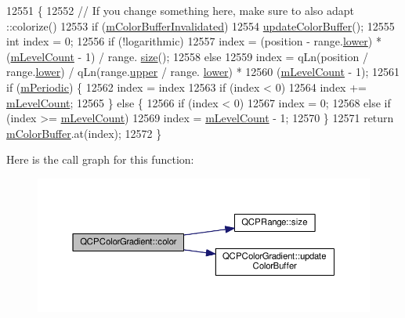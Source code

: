 \begin{DoxyCode}
12551                                                \{
12552   \textcolor{comment}{// If you change something here, make sure to also adapt ::colorize()}
12553   \textcolor{keywordflow}{if} (\hyperlink{class_q_c_p_color_gradient_abacf55e11f67d6722a687af1bb2687bd}{mColorBufferInvalidated})
12554     \hyperlink{class_q_c_p_color_gradient_a353f15ab3ab586eebf1f6b58c3e2707b}{updateColorBuffer}();
12555   \textcolor{keywordtype}{int} index = 0;
12556   \textcolor{keywordflow}{if} (!logarithmic)
12557     index = (position - range.\hyperlink{class_q_c_p_range_aa3aca3edb14f7ca0c85d912647b91745}{lower}) * (\hyperlink{class_q_c_p_color_gradient_a98fb68e359904b2c991fcae3e38a211a}{mLevelCount} - 1) / range.
      \hyperlink{class_q_c_p_range_afa57c13049b965edb6fd1c00ac56338a}{size}();
12558   \textcolor{keywordflow}{else}
12559     index = qLn(position / range.\hyperlink{class_q_c_p_range_aa3aca3edb14f7ca0c85d912647b91745}{lower}) / qLn(range.\hyperlink{class_q_c_p_range_ae44eb3aafe1d0e2ed34b499b6d2e074f}{upper} / range.
      \hyperlink{class_q_c_p_range_aa3aca3edb14f7ca0c85d912647b91745}{lower}) *
12560             (\hyperlink{class_q_c_p_color_gradient_a98fb68e359904b2c991fcae3e38a211a}{mLevelCount} - 1);
12561   \textcolor{keywordflow}{if} (\hyperlink{class_q_c_p_color_gradient_a4b07deeb20ca1ee2d5ea7e01bf0420af}{mPeriodic}) \{
12562     index = index %
12563     \textcolor{keywordflow}{if} (index < 0)
12564       index += \hyperlink{class_q_c_p_color_gradient_a98fb68e359904b2c991fcae3e38a211a}{mLevelCount};
12565   \} \textcolor{keywordflow}{else} \{
12566     \textcolor{keywordflow}{if} (index < 0)
12567       index = 0;
12568     \textcolor{keywordflow}{else} \textcolor{keywordflow}{if} (index >= \hyperlink{class_q_c_p_color_gradient_a98fb68e359904b2c991fcae3e38a211a}{mLevelCount})
12569       index = \hyperlink{class_q_c_p_color_gradient_a98fb68e359904b2c991fcae3e38a211a}{mLevelCount} - 1;
12570   \}
12571   \textcolor{keywordflow}{return} \hyperlink{class_q_c_p_color_gradient_af8b5f0739faa5f8295154d47ce38ecff}{mColorBuffer}.at(index);
12572 \}
\end{DoxyCode}


Here is the call graph for this function\+:\nopagebreak
\begin{figure}[H]
\begin{center}
\leavevmode
\includegraphics[width=350pt]{class_q_c_p_color_gradient_a0599545c859268b025d2060dea741cea_cgraph}
\end{center}
\end{figure}




